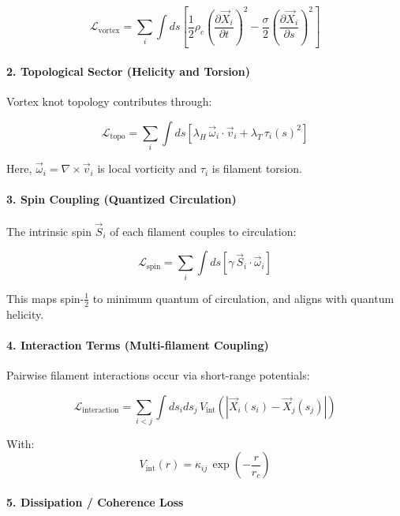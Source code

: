 \documentclass[11pt]{article}
\begin{document}
    \[
        \mathcal{L}_{\text{vortex}} = \sum_i \int ds \left[ \frac{1}{2} \rho_c \left( \frac{\partial \vec{X}_i}{\partial t} \right)^2 - \frac{\sigma}{2} \left( \frac{\partial \vec{X}_i}{\partial s} \right)^2 \right]
    \]

    \paragraph{2. Topological Sector (Helicity and Torsion)}

    Vortex knot topology contributes through:

    \[
        \mathcal{L}_{\text{topo}} = \sum_i \int ds \left[ \lambda_H \, \vec{\omega}_i \cdot \vec{v}_i + \lambda_T \, \tau_i(s)^2 \right]
    \]

    Here, \( \vec{\omega}_i = \nabla \times \vec{v}_i \) is local vorticity and \( \tau_i \) is filament torsion.

    \paragraph{3. Spin Coupling (Quantized Circulation)}

    The intrinsic spin \( \vec{S}_i \) of each filament couples to circulation:

    \[
        \mathcal{L}_{\text{spin}} = \sum_i \int ds \left[ \gamma \, \vec{S}_i \cdot \vec{\omega}_i \right]
    \]

    This maps spin-\(\frac{1}{2}\) to minimum quantum of circulation, and aligns with quantum helicity.

    \paragraph{4. Interaction Terms (Multi-filament Coupling)}

    Pairwise filament interactions occur via short-range potentials:

    \[
        \mathcal{L}_{\text{interaction}} = \sum_{i<j} \int ds_i ds_j \, V_{\text{int}}\left( |\vec{X}_i(s_i) - \vec{X}_j(s_j)| \right)
    \]

    With:
    \[
        V_{\text{int}}(r) = \kappa_{ij} \, \exp\left(-\frac{r}{r_c}\right)
    \]

    \paragraph{5. Dissipation / Coherence Loss}
\end{document}
